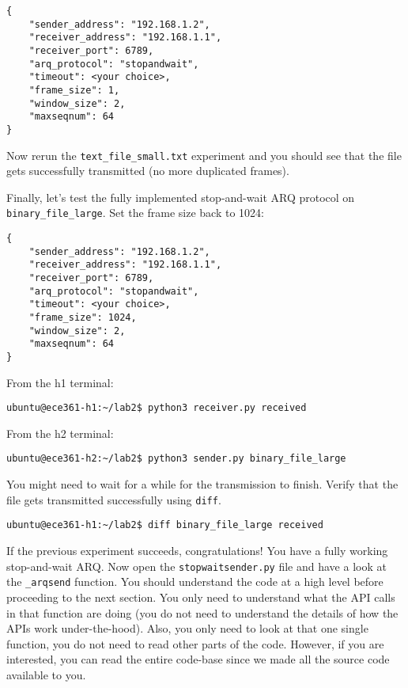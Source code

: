 \documentclass[11pt]{article}
\begin{document}
\begin{lstlisting}[style=ece361-shell-base, caption={Configuration For Large File}]
{
    "sender_address": "192.168.1.2",
    "receiver_address": "192.168.1.1",
    "receiver_port": 6789,
    "arq_protocol": "stopandwait",
    "timeout": <your choice>,
    "frame_size": 1,
    "window_size": 2,
    "maxseqnum": 64
}
\end{lstlisting}

Now rerun the \texttt{text\_file\_small.txt} experiment and you should see that the file gets successfully transmitted (no more duplicated frames).

Finally, let's test the fully implemented stop-and-wait ARQ protocol on \texttt{binary\_file\_large}. Set the frame size back to 1024:
\begin{lstlisting}[style=ece361-shell-base, caption={Configuration For Large File}]
{
    "sender_address": "192.168.1.2",
    "receiver_address": "192.168.1.1",
    "receiver_port": 6789,
    "arq_protocol": "stopandwait",
    "timeout": <your choice>,
    "frame_size": 1024,
    "window_size": 2,
    "maxseqnum": 64
}
\end{lstlisting}

From the h1 terminal:
\begin{lstlisting}[style=ece361-shell-base, caption={}]
ubuntu@ece361-h1:~/lab2$ python3 receiver.py received
\end{lstlisting}

From the h2 terminal:
\begin{lstlisting}[style=ece361-shell-base, caption={}]
ubuntu@ece361-h2:~/lab2$ python3 sender.py binary_file_large
\end{lstlisting}

\noindent You might need to wait for a while for the transmission to finish. Verify that the file gets transmitted successfully using \texttt{diff}.
\begin{lstlisting}[style=ece361-shell-base, caption={}]
ubuntu@ece361-h1:~/lab2$ diff binary_file_large received
\end{lstlisting}

If the previous experiment succeeds, congratulations! You have a fully working stop-and-wait ARQ.
Now open the \texttt{stopwaitsender.py} file and have a look at the \texttt{\_arqsend} function.
You should understand the code at a high level before proceeding to the next section. You only need to understand what the API calls in that function are doing (you do not need to understand the details of how the APIs work under-the-hood).
Also, you only need to look at that one single function, you do not need to read other parts of the code.
However, if you are interested, you can read the entire code-base since we made all the source code available to you.
\end{document}
